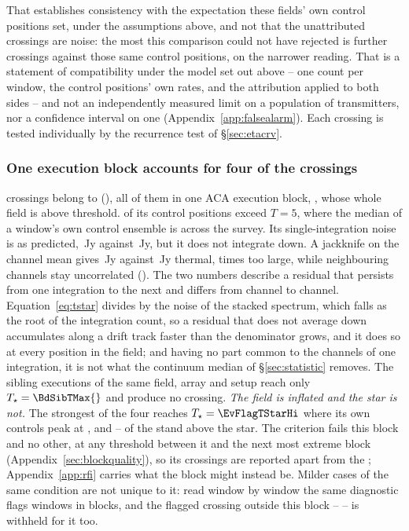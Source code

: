That establishes consistency with the expectation these fields' own
control positions set, under the assumptions above, and not that the
unattributed crossings are noise: the most this comparison could not have
rejected is \CeAddLim{} further crossings against those same control
positions, \FrNarrowAddLim{} on the narrower reading. That is a statement of
compatibility under the model set out above -- one count per window, the
control positions' own rates, and the attribution applied to both sides --
and not an independently measured limit on a population of transmitters, nor
a confidence interval on one (Appendix~\ref{app:falsealarm}). Each
crossing is tested individually by the recurrence test of
\S\ref{sec:etacrv}.

\subsubsection{One execution block accounts for four of the crossings}
\label{sec:bdblock}

\BdNCross{} crossings belong to \BdStar{} (\BdAlias), all of them in one
ACA execution block, \texttt{\BdBlock}, whose whole field is above threshold.
\BdNCtrlAbove{} of its \BdNCtrl{} control positions exceed $T=5$, where the
median of a window's own control ensemble is \BdSurvCtrlMed{} across the
survey. Its single-integration noise is as predicted, \BdRmsMeas\,Jy against
\BdRmsPred\,Jy, but it does not integrate down. A jackknife on the channel
mean gives \BdJack\,Jy against \BdThermal\,Jy thermal, \BdJackRatio{} times
too large, while neighbouring channels stay uncorrelated (\BdChanCorr). The
two numbers describe a residual that persists from one integration to the next and differs from
channel to channel. Equation~\ref{eq:tstar} divides by the noise of the
stacked spectrum, which falls as the root of the integration count, so a
residual that does not average down accumulates along a drift track faster
than the denominator grows, and it does so at every position in the field; and
having no part common to the channels of one integration, it is not what the
continuum median of \S\ref{sec:statistic} removes. The \BdNSibling{}
sibling executions of the same field, array and setup reach only
$T_\star=\BdSibTMax{}$ and produce no crossing. \emph{The field is inflated and the star is not.} The strongest of the
four reaches $T_\star=\EvFlagTStarHi$ where its own controls peak at
\EvFlagCtrlAtHi, and \EvFlagNgeLo--\EvFlagNgeHi{} of the \BdNCtrl{} stand
above the star. The
criterion fails this block and no other, at any threshold between it and the
next most extreme block (Appendix~\ref{sec:blockquality}), so its
\BdNCross{} crossings are reported apart from the \EvNCrossQp{}; Appendix~\ref{app:rfi} carries what the block
might instead be. Milder cases of the same condition are not unique to it:
read window by window the same diagnostic flags \DqNWin{} windows in
\BkFlagNBlock{} blocks, and the \BkFlagNCrossOther{} flagged crossing outside
this block -- \BkFlagOtherStar{} -- is withheld for it too.

